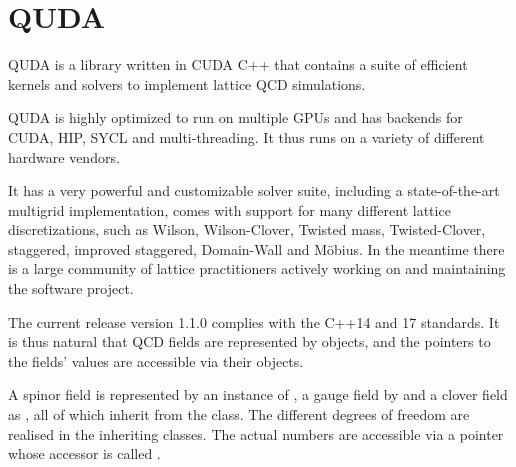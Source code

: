 \chapter{QUDA}
\label{ch:p1:quda}

QUDA \cite{QUDApaper} is a library written in CUDA C++ that contains a suite of efficient kernels and solvers to implement lattice QCD simulations.

QUDA is highly optimized to run on multiple GPUs and has backends for CUDA, HIP, SYCL and multi-threading. It thus runs on a variety of different hardware vendors.

It has a very powerful and customizable solver suite, including a state-of-the-art multigrid implementation, comes with support for many different lattice discretizations, such as Wilson, Wilson-Clover, Twisted mass, Twisted-Clover, staggered, improved staggered, Domain-Wall and Möbius. In the meantime there is a large community of lattice practitioners actively working on and maintaining the software project.

The current release version 1.1.0 complies with the C++14 and 17 standards. It is thus natural that QCD fields are represented by objects, and the pointers to the fields' values are accessible via their objects.


A spinor field is represented by an instance of , a gauge field by  and a clover field as , all of which inherit from the  class. The different degrees of freedom are realised in the inheriting classes. The actual numbers are accessible via a pointer whose accessor is called .


